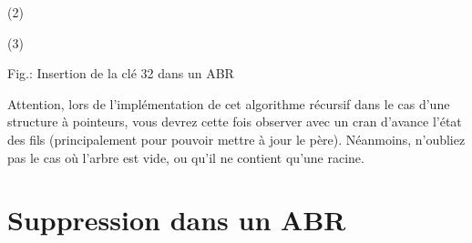 \documentclass[11pt,a4paper]{article}
\begin{document}
\begin{table}[ht!]
\begin{minipage}{0.30\textwidth}
(2)

  \end{minipage}
  \hfillx
  \begin{minipage}{0.30\textwidth}
    \centering


(3)

  \end{minipage}
\caption{Fig.\thefigure : Insertion de la clé 32 dans un ABR}
\label{fig:example3-BST-insertion-leaf-1}
\end{table}


Attention, lors de l'implémentation de cet algorithme récursif dans le cas d'une structure à pointeurs, vous devrez cette fois observer avec un cran d'avance l'état des fils (principalement pour pouvoir mettre à jour le père).
Néanmoins, n'oubliez pas le cas où l'arbre est vide, ou qu'il ne contient qu'une racine.






\bigskip


\section{Suppression dans un ABR}
\end{document}
